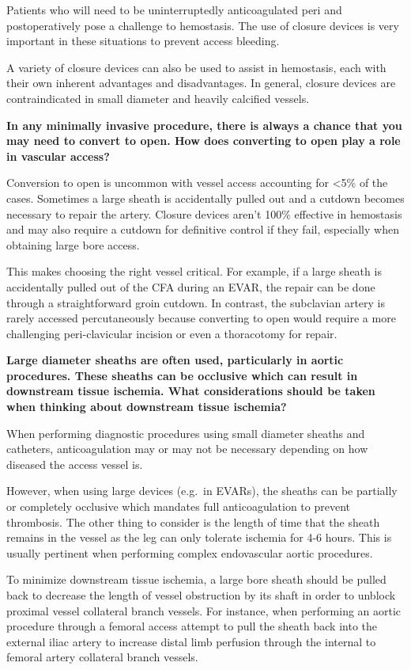 \documentclass[
]{book}
\begin{document}
Patients who will need to be uninterruptedly anticoagulated peri and
postoperatively pose a challenge to hemostasis. The use of closure
devices is very important in these situations to prevent access
bleeding.

A variety of closure devices can also be used to assist in hemostasis,
each with their own inherent advantages and disadvantages. In general,
closure devices are contraindicated in small diameter and heavily
calcified vessels.

\textbf{In any minimally invasive procedure, there is always a chance that you
may need to convert to open. How does converting to open play a role in
vascular access?}

Conversion to open is uncommon with vessel access accounting for \textless5\% of
the cases. Sometimes a large sheath is accidentally pulled out and a
cutdown becomes necessary to repair the artery. Closure devices aren't
100\% effective in hemostasis and may also require a cutdown for
definitive control if they fail, especially when obtaining large bore
access.

This makes choosing the right vessel critical. For example, if a large
sheath is accidentally pulled out of the CFA during an EVAR, the repair
can be done through a straightforward groin cutdown. In contrast, the
subclavian artery is rarely accessed percutaneously because converting
to open would require a more challenging peri-clavicular incision or
even a thoracotomy for repair.

\textbf{Large diameter sheaths are often used, particularly in aortic
procedures. These sheaths can be occlusive which can result in
downstream tissue ischemia. What considerations should be taken when
thinking about downstream tissue ischemia?}

When performing diagnostic procedures using small diameter sheaths and
catheters, anticoagulation may or may not be necessary depending on how
diseased the access vessel is.

However, when using large devices (e.g.~in EVARs), the sheaths can be
partially or completely occlusive which mandates full anticoagulation to
prevent thrombosis. The other thing to consider is the length of time
that the sheath remains in the vessel as the leg can only tolerate
ischemia for 4-6 hours. This is usually pertinent when performing
complex endovascular aortic procedures.

To minimize downstream tissue ischemia, a large bore sheath should be
pulled back to decrease the length of vessel obstruction by its shaft in
order to unblock proximal vessel collateral branch vessels. For
instance, when performing an aortic procedure through a femoral access
attempt to pull the sheath back into the external iliac artery to
increase distal limb perfusion through the internal to femoral artery
collateral branch vessels.~~
\end{document}
